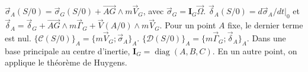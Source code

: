 \begin{corrigebox}
$\vec\sigma_A(S/0)=\vec\sigma_G(S/0)+
                \overrightarrow{AG}\wedge m\vec V_G$, avec
                $\vec\sigma_G=\mathbf I_G\vec\Omega$.
$\vec\delta_A(S/0)=d\vec\sigma_A/dt|_0$ et
                $\vec\delta_A=\vec\delta_G+
                \overrightarrow{AG}\wedge m\vec\Gamma_G+
                \vec V(A/0)\wedge m\vec V_G$. Pour un point $A$ fixe, le dernier terme
                est nul.
$\{\mathcal C(S/0)\}_A=\{m\vec V_G;\vec\sigma_A\}_A$.
$\{\mathcal D(S/0)\}_A=\{m\vec\Gamma_G;\vec\delta_A\}_A$.
Dans une base principale au centre d'inertie,
                $\mathbf I_G=\operatorname{diag}(A,B,C)$. En un autre point, on applique
                le théorème de Huygens.
\end{corrigebox}
